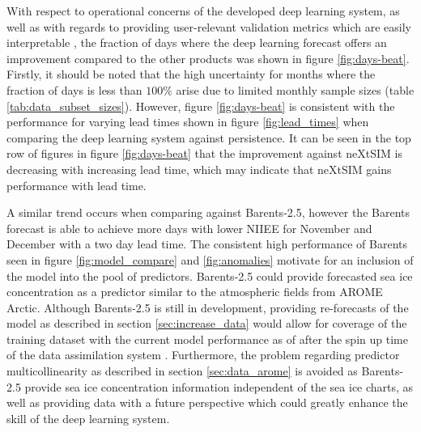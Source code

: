 \documentclass[../main/thesis]{subfiles}
\begin{document}
With respect to operational concerns of the developed deep learning system, as well as with regards to providing user-relevant validation metrics which are easily interpretable \citep{Veland2021}, the fraction of days where the deep learning forecast offers an improvement compared to the other products was shown in figure \ref{fig:days-beat}. Firstly, it should be noted that the high uncertainty for months where the fraction of days is less than $100\%$ arise due to limited monthly sample sizes (table \ref{tab:data_subset_sizes}). However, figure \ref{fig:days-beat} is consistent with the performance for varying lead times shown in figure \ref{fig:lead_times} when comparing the deep learning system against persistence. It can be seen in the top row of figures in figure \ref{fig:days-beat} that the improvement against neXtSIM is decreasing with increasing lead time, which may indicate that neXtSIM gains performance with lead time. 

A similar trend occurs when comparing against Barents-2.5, however the Barents forecast is able to achieve more days with lower NIIEE for November and December with a two day lead time. The consistent high performance of Barents seen in figure \ref{fig:model_compare} and \ref{fig:anomalies} motivate for an inclusion of the model into the pool of predictors. Barents-2.5 could provide forecasted sea ice concentration as a predictor similar to the atmospheric fields from AROME Arctic. Although Barents-2.5 is still in development, providing re-forecasts of the model as described in section \ref{sec:increase_data} would allow for coverage of the training dataset with the current model performance as of after the spin up time of the data assimilation system \citep{Roehrs2022}. Furthermore, the problem regarding predictor multicollinearity as described in section \ref{sec:data_arome} is avoided as Barents-2.5 provide sea ice concentration information independent of the sea ice charts, as well as providing data with a future perspective which could greatly enhance the skill of the deep learning system.
\end{document}
